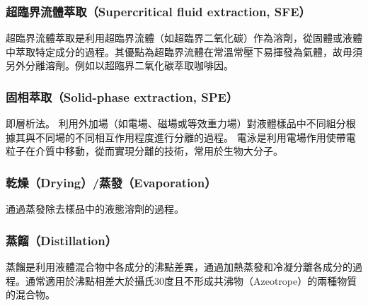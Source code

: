 \documentclass[a4paper,12pt]{article}
\begin{document}
\begin{itemize}
\subsubsection{超臨界流體萃取（Supercritical fluid extraction, SFE）}
超臨界流體萃取是利用超臨界流體（如超臨界二氧化碳）作為溶劑，從固體或液體中萃取特定成分的過程。其優點為超臨界流體在常溫常壓下易揮發為氣體，故毋須另外分離溶劑。例如以超臨界二氧化碳萃取咖啡因。
\subsubsection{固相萃取（Solid-phase extraction, SPE）}
即層析法。
利用外加場（如電場、磁場或等效重力場）對液體樣品中不同組分根據其與不同場的不同相互作用程度進行分離的過程。
電泳是利用電場作用使帶電粒子在介質中移動，從而實現分離的技術，常用於生物大分子。
\subsubsection{乾燥（Drying）/蒸發（Evaporation）}
通過蒸發除去樣品中的液態溶劑的過程。
\subsubsection{蒸餾（Distillation）}
蒸餾是利用液體混合物中各成分的沸點差異，通過加熱蒸發和冷凝分離各成分的過程。通常適用於沸點相差大於攝氏30度且不形成共沸物（Azeotrope）的兩種物質的混合物。


\end{itemize}
\end{document}
